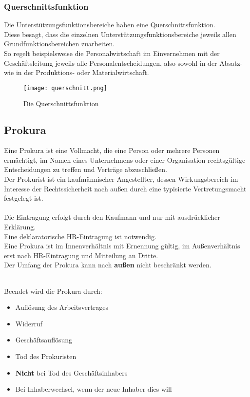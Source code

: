\documentclass[asp1.tex]{subfiles}
\begin{document}
\subsubsection{Querschnittsfunktion}
Die Unterstützungsfunktionsbereiche haben eine Querschnittsfunktion. \\
Diese besagt, dass die einzelnen Unterstützungsfunktionsbereiche jeweils allen Grundfunktionsbereichen zuarbeiten. \\
So regelt beispielsweise die Personalwirtschaft im Einvernehmen mit der Geschäftsleitung jeweils alle Personalentscheidungen, also sowohl in der Absatz- wie in der Produktions- oder Materialwirtschaft.

\begin{figure}[H]
    \begin{center}
        \texttt{[image: querschnitt.png]}
    \end{center}
    \caption{Die Querschnittsfunktion}
    \label{fig: Die Querschnittsfunktion}
\end{figure}

\subsection{Prokura}
Eine Prokura ist eine Vollmacht, die eine Person oder mehrere Personen ermächtigt, im Namen eines Unternehmens oder einer Organisation rechtsgültige Entscheidungen zu treffen und Verträge abzuschließen. \\
Der Prokurist ist ein kaufmännischer Angestellter, dessen Wirkungsbereich im Interesse der Rechtssicherheit nach außen durch eine typisierte Vertretungsmacht festgelegt ist. \\ \\
Die Eintragung erfolgt durch den Kaufmann und nur mit ausdrücklicher Erklärung. \\
Eine deklaratorische HR-Eintragung ist notwendig. \\
Eine  Prokura ist im  Innenverhältnis mit Ernennung gültig, im Außenverhältnis erst  nach HR-Eintragung und Mitteilung an Dritte. \\
Der Umfang der Prokura kann nach \textbf{außen}  nicht beschränkt werden. \\ \\

\break

Beendet  wird  die  Prokura durch:
\begin{itemize}
    \item Auflösung des Arbeitsvertrages
    \item Widerruf
    \item Geschäftsauflösung
    \item Tod des Prokuristen
    \item \textbf{Nicht}  bei Tod des Geschäftsinhabers
    \item Bei Inhaberwechsel, wenn der neue Inhaber dies will
\end{itemize}
\end{document}
